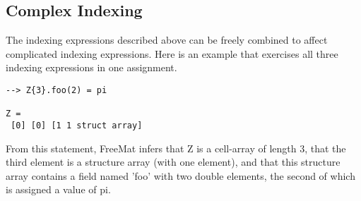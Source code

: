 \subsection{Complex Indexing}

The indexing expressions described above can be freely combined
to affect complicated indexing expressions.  Here is an example
that exercises all three indexing expressions in one assignment.
\begin{verbatim}
--> Z{3}.foo(2) = pi

Z = 
 [0] [0] [1 1 struct array] 
\end{verbatim}
From this statement, FreeMat infers that Z is a cell-array of 
length 3, that the third element is a structure array (with one
element), and that this structure array contains a field named
'foo' with two double elements, the second of which is assigned
a value of pi.
